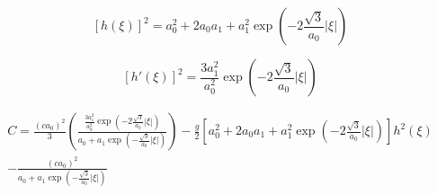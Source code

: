 \documentclass[subeqn]{article}
\begin{document}
\[\left[h\left(\xi\right)\right]^2 = a_0^2 + 2 a_0 a_1 + a_1^2 \exp\left(-2\frac{\sqrt{3}}{a_0} \left|\xi\right|\right) \]

\[\left[ h'\left(\xi\right)\right]^2 =\frac{3 a_1^2}{a_0^2}  \exp\left(-2\frac{\sqrt{3}}{a_0} \left|\xi\right|\right) \]


\begin{multline}
C = \frac{\left(c a_0\right)^2}{3} \left(\frac{\frac{3 a_1^2}{a_0^2}  \exp\left(-2\frac{\sqrt{3}}{a_0} \left|\xi\right|\right) }{a_0 + a_1 \exp\left(-\frac{\sqrt{3}}{a_0} \left|\xi\right|\right)} \right) -  \frac{g}{2} \left[a_0^2 + 2 a_0 a_1 + a_1^2 \exp\left(-2\frac{\sqrt{3}}{a_0} \left|\xi\right|\right)\right] h^2(\xi) \\- \frac{{\left(c a_0\right)^2}}{a_0 + a_1 \exp\left(-\frac{\sqrt{3}}{a_0} \left|\xi\right|\right)}
\end{multline}
\end{document}

